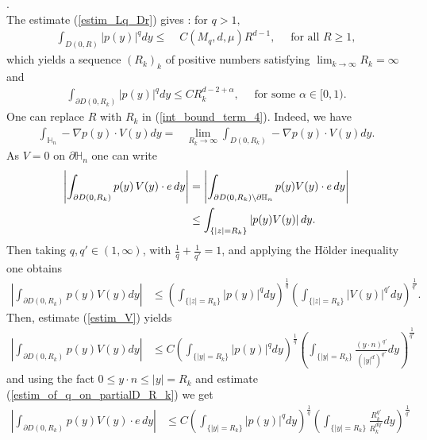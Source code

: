 \documentclass[11pt, reqno]{amsart}
\theoremstyle{definition}
\theoremstyle{remark}
\numberwithin{equation}{section}
\newcommand{\bs}{\symbol{92}}
\begin{document}
\begin{appendices}
		.\\
		The estimate (\ref{estim_Lq_Dr}) gives : for $q>1,$
		\begin{align*}
			\int_{D(0,R)} |p(y)|^q dy
			\leq \;  &   C(M_q, d,\mu) R^{d-1},\quad \mbox{ for all  } R\geq 1,
		\end{align*}	
		which  yields a sequence  $(R_k)_k$  of positive numbers satisfying  $\lim_{k\rightarrow\infty} R_k =\infty$ and
		\begin{align}\label{estim_of_q_on_partialD_R_k}
			\int_{ \partial D(0,R_k)  } |p(y)|^q dy \leq C R_k^{d-2+\alpha}, \quad \mbox{ for some } \alpha\in[0,1).
		\end{align}	
		One can replace $R$ with $R_k$ in (\ref{int_bound_term_4}). Indeed, we have
		\begin{align*}
			\int_{ \mathbb{H}_n } - \nabla p(y)  \cdot V(y) dy=&\lim_{R_k\rightarrow\infty}	\int_{D(0,R_k)}  - \nabla p(y) \cdot V(y) dy.
		\end{align*}
		As $V=0$ on $\partial\mathbb{H}_n $ one can write
		\begin{align*}
			\left|	\int_{\partial D(0,R_k)}   p(y) \, V(y) \cdot e \,  dy\right| & =	\left|\int_{\partial D(0,R_k)\bs \partial\mathbb{H}_n}   p(y) V(y) \cdot e \, dy \right|\\
			& \leq\int_{ \{ |z|=R_k\}  }	\left|  p(y) V(y)\right| dy .
		\end{align*}
		Then taking  $q,q'\in(1,\infty)$, with $\frac{1}{q}+\frac{1}{q'}=1$,  and applying the H\"older inequality one obtains 
		\begin{align*}
			\left|	\int_{\partial D(0,R_k)}   p(y)   V(y) dy\right| 	
			& \leq	\left(\int_{  \{ |z|=R_k\}  }   | p(y)|^q dy\right)^{\frac{1}{q}}\left(\int_{ \{ |z|=R_k\}   }   |  V(y)|^{q'} dy \right)^{\frac{1}{q'}}.
		\end{align*}
		Then, estimate  (\ref{estim_V}) yields
		\begin{align*}
			\left|	\int_{\partial D(0,R_k)}   p(y)   V(y) dy\right| 	
			&\leq  C\left(\int_{  \{ |y|=R_k\}  }   |p(y)|^q dy\right)^{\frac{1}{q}}\left(\int_{ \{ |y|=R_k\}   } \frac{(y\cdot n)^{q'}}{(|y|^d)^{ q'}} dy \right)^{\frac{1}{q'}}
		\end{align*}
		and using the fact $0\leq y\cdot n \leq |y|= R_k$ and estimate (\ref{estim_of_q_on_partialD_R_k}) we get
		\begin{align*}
			\left|	\int_{\partial D(0,R_k)}   p(y)  V(y) \cdot e \, dy\right| 	
			&\leq C\left(\int_{  \{ |y|=R_k\}  }   | p(y)|^q dy\right)^{\frac{1}{q}} \left(\int_{ \{ |y|=R_k\}   } \frac{R^{q'}_k}{R_k^{dq'}} dy\right)^{\frac{1}{q'}}\\

\end{align*}
\end{appendices}
\end{document}
